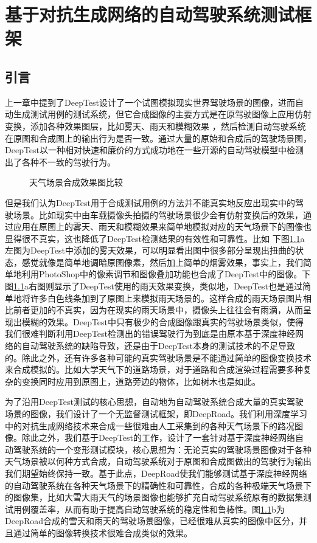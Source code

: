 \chapter{基于对抗生成网络的自动驾驶系统测试框架}

\section{引言}

上一章中提到了DeepTest设计了一个试图模拟现实世界驾驶场景的图像，进而自动生成测试用例的测试系统，但它合成图像的主要方式是在原驾驶图像上应用仿射变换，添加各种效果图层，比如雾天、雨天和模糊效果
，然后检测自动驾驶系统在原图和合成图上的输出行为是否一致。通过大量的原始和合成后的驾驶场景图，DeepTest以一种相对快速和廉价的方式成功地在一些开源的自动驾驶模型中检测出了各种不一致的驾驶行为。

\begin{figure}[h]
    \centering
    \caption{天气场景合成效果图比较}
    \label{label-deep}
\end{figure}

但是我们认为DeepTest用于合成测试用例的方法并不能真实地反应出现实中的驾驶场景。比如现实中由车载摄像头拍摄的驾驶场景很少会有仿射变换后的效果，通过应用在原图上的雾天、雨天和模糊效果来简单地模拟对应的天气场景下的图像也显得很不真实，这也降低了DeepTest检测结果的有效性和可靠性。比如
下图\ref{label-deep}a左图为DeepTest中添加的雾天效果，可以明显看出图中很多部分呈现出扭曲的状态，感觉就像是简单地调暗原图像素，然后加上简单的烟雾效果，事实上，我们简单地利用PhotoShop中的像素调节和图像叠加功能也合成了DeepTest中的图像。下图\ref{label-deep}a右图则显示了DeepTest使用的雨天效果变换，类似地，DeepTest也是通过简单地将许多白色线条加到了原图上来模拟雨天场景的。这样合成的雨天场景图片相比前者更加的不真实，因为在现实的雨天场景中，摄像头上往往会有雨滴，从而呈现出模糊的效果。DeepTest中只有极少的合成图像跟真实的驾驶场景类似，使得我们很难判断利用DeepTest检测出的错误驾驶行为到底是由原本基于深度神经网络的自动驾驶系统的缺陷导致，还是由于DeepTest本身的测试技术的不足导致的。除此之外，还有许多各种可能的真实驾驶场景是不能通过简单的图像变换技术来合成模拟的。比如大学天气下的道路场景，对于道路和合成渲染过程需要多种复杂的变换同时应用到原图上，道路旁边的物体，比如树木也是如此。

为了沿用DeepTest测试的核心思想，自动地为自动驾驶系统合成大量的真实驾驶场景的图像，我们设计了一个无监督测试框架，即DeepRoad。我们利用深度学习中的对抗生成网络技术来合成一些很难由人工采集到的各种天气场景下的路况图像。除此之外，我们基于DeepTest的工作，设计了一套针对基于深度神经网络自动驾驶系统的一个变形测试模块，核心思想为：无论真实的驾驶场景图像对于各种天气场景被以何种方式合成，自动驾驶系统对于原图和合成图做出的驾驶行为输出我们期望始终保持一致。基于此点，DeepRoad使我们能够测试基于深度神经网络的自动驾驶系统在各种天气场景下的精确性和可靠性，合成的各种极端天气场景下的图像集，比如大雪大雨天气的场景图像也能够扩充自动驾驶系统原有的数据集测试用例覆盖率，从而有助于提高自动驾驶系统的稳定性和鲁棒性。图\ref{label-deep}b为DeepRoad合成的雪天和雨天的驾驶场景图像，已经很难从真实的图像中区分，并且通过简单的图像转换技术很难合成类似的效果。

